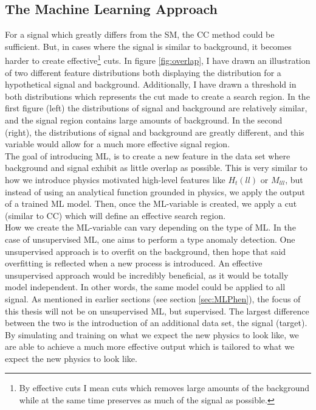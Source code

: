 \subsection{The Machine Learning Approach}
For a signal which greatly differs from the \ac{SM}, the \ac{CC} method could be sufficient. But, in 
cases where the signal is similar to background, it becomes harder to create effective\footnote{By effective
cuts I mean cuts which removes large amounts of the background while at the same time preserves as much of 
the signal as possible.} cuts. In figure \ref{fig:overlap}, I have drawn an illustration of two different feature distributions both 
displaying the distribution for a hypothetical signal and background. Additionally, I have drawn a 
threshold in both distributions which represents the cut made to create a search region. In the first 
figure (left) the distributions of signal and background are relatively similar, and the signal region 
contains large amounts of background. In the second (right), the distributions of signal and background 
are greatly different, and this variable would allow for a much more effective signal region. 
\\
The goal of introducing \ac{ML}, is to create a new feature in the data set where background and signal
exhibit as little overlap as possible. This is very similar to how we introduce physics motivated high-level
features like $H_t(ll)$ or $M_{lll}$, but instead of using an analytical function grounded in physics, 
we apply the output of a trained \ac{ML} model. Then, once the \ac{ML}-variable is created, 
we apply a cut (similar to \ac{CC}) which will define an effective search region. 
\\
How we create the \ac{ML}-variable can vary depending on the type of \ac{ML}. In the case of unsupervised 
\ac{ML}, one aims to perform a type anomaly detection. One unsupervised approach is to overfit on the background,
then hope that said overfitting is reflected when a new process is introduced. An effective unsupervised approach
would be incredibly beneficial, as it would be totally model independent. In other words, the same model could be applied 
to all signal. As mentioned in earlier sections (see section \ref{sec:MLPhen}), the focus of this thesis will not be on 
unsupervised \ac{ML}, but supervised. The largest difference between the two is the introduction of an additional data set,
the signal (target). By simulating and training on what we expect the new physics to look like, we are able to achieve a much more 
effective output which is tailored to what we expect the new physics to look like.